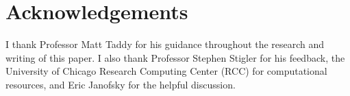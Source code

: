 \documentclass[12pt]{article}
\begin{document}
\section{Acknowledgements}\label{conclusion}

I thank Professor Matt Taddy for his guidance throughout the research and writing of this paper. I also thank Professor Stephen Stigler for his feedback, the University of Chicago Research Computing Center (RCC) for computational resources, and Eric Janofsky for the helpful discussion. 


\newpage



\end{document}
